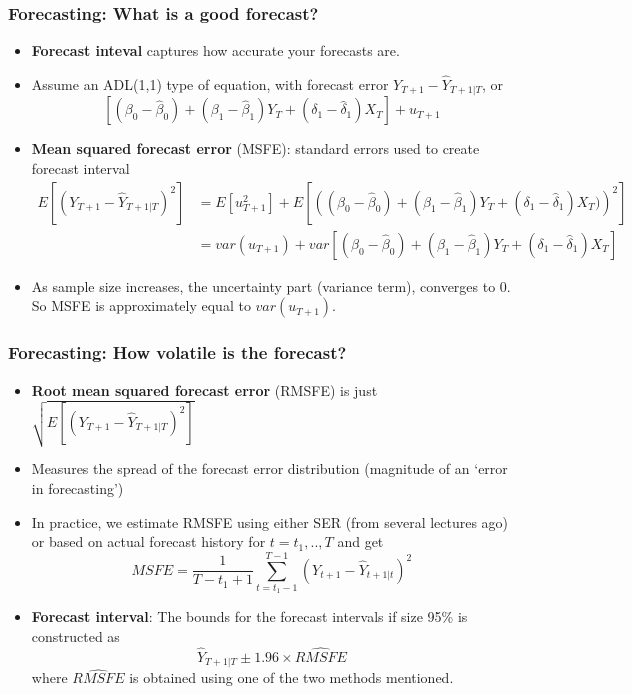 \documentclass[aspectratio=169]{beamer}
\begin{document}
\begin{frame}
\frametitle{Forecasting: What is a good forecast?}
\begin{itemize}
\item \textbf{Forecast inteval} captures how accurate your forecasts are. 
\item Assume an ADL(1,1) type of equation, with forecast error $Y_{T+1}-\hat{Y}_{T+1|T}$, or
\[
[(\beta_0-\hat{\beta}_0)+(\beta_1-\hat{\beta}_1)Y_{T}+(\delta_1-\hat{\delta}_1)X_T]+u_{T+1}
\] 
\item \textbf{Mean squared forecast error} (MSFE): standard errors used to create forecast interval
\[
\begin{aligned}
E[(Y_{T+1}-\hat{Y}_{T+1|T})^2]&=E[u_{T+1}^2]+E\left[\left((\beta_0-\hat{\beta}_0)+(\beta_1-\hat{\beta}_1)Y_{T}+(\delta_1-\hat{\delta}_1)X_T)\right)^2\right]\\
&=var(u_{T+1}) + var[(\beta_0-\hat{\beta}_0)+(\beta_1-\hat{\beta}_1)Y_{T}+(\delta_1-\hat{\delta}_1)X_T]
\end{aligned}
\]
\item As sample size increases, the uncertainty part (variance term), converges to 0. So MSFE is approximately equal to $var(u_{T+1})$. 
\end{itemize}
\end{frame}

\begin{frame}
\frametitle{Forecasting: How volatile is the forecast?}
\begin{itemize}
\item \textbf{Root mean squared forecast error} (RMSFE) is just $\sqrt{E[(Y_{T+1}-\hat{Y}_{T+1|T})^2]}$
\item Measures the spread of the forecast error distribution (magnitude of an `error in forecasting')
\item In practice, we estimate RMSFE using either SER (from several lectures ago) or based on actual forecast history for $t=t_1,..,T$ and get 
\[
MSFE = \frac{1}{T-t_1+1}\sum_{t=t_1-1}^{T-1}(Y_{t+1}-\hat{Y}_{t+1|t})^2
\]
\item \textbf{Forecast interval}: The bounds for the forecast intervals if size 95\% is constructed as
\[
\hat{Y}_{T+1|T}\pm 1.96\times \widehat{RMSFE}
\]
where $\widehat{RMSFE}$ is obtained using one of the two methods mentioned. 

\end{itemize}
\end{frame}
\end{document}
